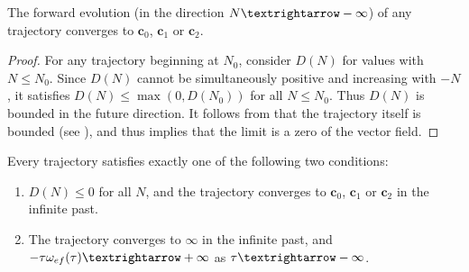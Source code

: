\begin{lem}
\label{lem:D-unbounded} The forward evolution (in the direction $N\textrightarrow-\infty$) of any trajectory converges to $\mathbf{c}_{0}$, $\mathbf{c}_{1}$ or $\mathbf{c}_{2}$. 
\end{lem}

\begin{proof}
For any trajectory beginning at $N_{0}$, consider $D(N)$ for values with $N\leq N_{0}$. Since $D(N)$ cannot be simultaneously positive and increasing with $-N$, it satisfies $D(N)\leq\max(0,D(N_{0}))$ for all $N\leq N_{0}$. Thus $D(N)$ is bounded in the future direction. It follows from  that the trajectory itself is bounded (see ), and thus  implies that the limit is a zero of the vector field. 
\end{proof}
%
\begin{lem}
\label{lem:dichotomy}Every trajectory satisfies exactly one of the following two conditions:
\begin{enumerate}
\item \label{enu:bounded-traj}$D(N)\leq0$ for all $N$, and the trajectory converges to $\mathbf{c}_{0}$, $\mathbf{c}_{1}$ or $\mathbf{c}_{2}$ in the infinite past.
\item \label{enu:conv-to-inf}The trajectory converges to $\bm{\infty}$ in the infinite past, and $-\tau\omega_{ef}(\tau)\textrightarrow+\infty$ as $\tau\textrightarrow-\infty$.
\end{enumerate}
\end{lem}

